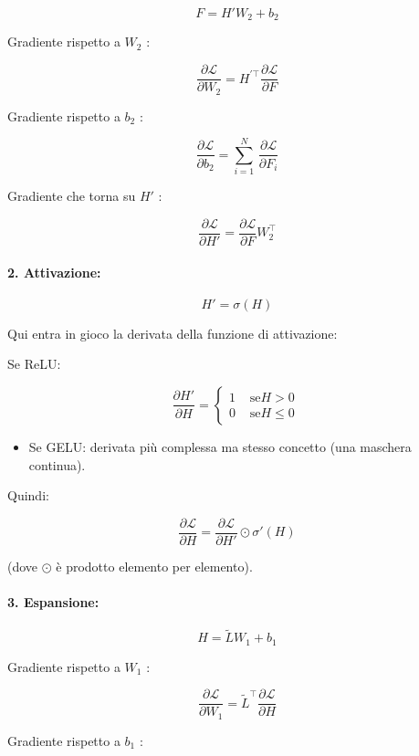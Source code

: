 \documentclass[
  11pt,
]{article}
\begin{document}
\[F = H'W_{2} + b_{2}\]


Gradiente rispetto a \(W_{2}\) :


\[\frac{\partial\mathcal{L}}{\partial W_{2}} = H^{'\top}\frac{\partial\mathcal{L}}{\partial F}\]


Gradiente rispetto a \(b_{2}\) :


\[\frac{\partial\mathcal{L}}{\partial b_{2}} = \sum_{i = 1}^{N}\,\frac{\partial\mathcal{L}}{\partial F_{i}}\]


Gradiente che torna su \(H'\) :


\[\frac{\partial\mathcal{L}}{\partial H'} = \frac{\partial\mathcal{L}}{\partial F}W_{2}^{\top}\]


\paragraph{2. \textbf{Attivazione:}}


\[H' = \sigma(H)\]

Qui entra in gioco la derivata della funzione di attivazione:


Se ReLU:


\[\frac{\partial H'}{\partial H} = \left\{ \begin{matrix}
1 & \text{ se}H > 0 \\
0 & \text{ se}H \leq 0
\end{matrix} \right.\ \]


\begin{itemize}
\item
  Se GELU: derivata più complessa ma stesso concetto (una maschera
  continua).
\end{itemize}


Quindi:

\[\frac{\partial\mathcal{L}}{\partial H} = \frac{\partial\mathcal{L}}{\partial H'} \odot \sigma'(H)\]

(dove \(\odot\) è prodotto elemento per elemento).


\paragraph{3. \textbf{Espansione}:}


\[H = \widetilde{L}W_{1} + b_{1}\]


Gradiente rispetto a \(W_{1}\) :


\[\frac{\partial\mathcal{L}}{\partial W_{1}} = {\widetilde{L}}^{\top}\frac{\partial\mathcal{L}}{\partial H}\]


Gradiente rispetto a \(b_{1}\) :
\end{document}
